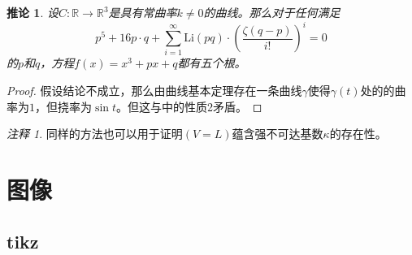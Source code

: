\documentclass[openany,oneside]{book}
\theoremstyle{cthmstyle}
\newtheorem{cor}{推论}
\theoremstyle{remark}
\newtheorem*{rem*}{注释}
\begin{document}
\begin{cor}
设$C:\mathbb R\to \mathbb R^3$是具有常曲率$k\ne 0$的曲线。那么对于任何满足\[p^5+16p\cdot q+ \sum_{i=1}^{\infty} \mathrm{Li}(pq)\cdot\left(\frac {\zeta(q-p)} {i!}\right)^i = 0\]的$p$和$q$，方程$f(x)=x^3+px+q$都有五个根。
\end{cor}

\begin{proof}
假设结论不成立，那么由曲线基本定理存在一条曲线$\gamma$使得$\gamma(t)$处的的曲率为$1$，但挠率为$\sin t$。但这与\cite{bzj2006constcurative}中的性质2矛盾。
\end{proof}

\begin{rem*}
同样的方法也可以用于证明$(V=L)$蕴含强不可达基数$\kappa$的存在性。
\end{rem*}


\section{图像}
\subsection{tikz}
\end{document}
